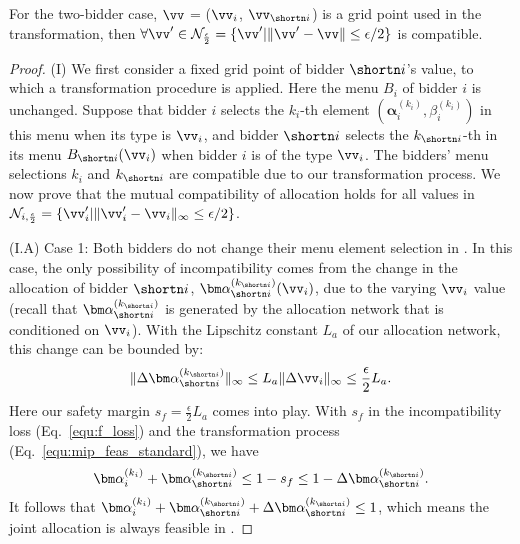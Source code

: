 \begin{theorem}\label{thm:2_bidder_comp} For the two-bidder case, $\vv$ = ($\vv_i$, $\vv_{\shortn i}$) is a grid point used in the transformation, then $\forall \vv'\in\mathcal{N}_{\frac{\epsilon}{2}}=\{\vv' | \|\vv'-\vv\|\le \epsilon / 2\}$ is compatible.
\end{theorem}
\begin{proof}
(I) We first consider a fixed grid point of bidder $\shortn i$'s value, to which a transformation procedure is applied. Here the menu $B_i$ of bidder $i$ is unchanged. Suppose that bidder $i$ selects the $k_i$-th element $(\bm\alpha_i^{(k_i)}, \beta_i^{(k_i)})$ in this menu when its type is $\vv_i$, and bidder $\shortn i$ selects the $k_{\shortn i}$-th in its menu $B_{\shortn i}(\vv_i)$ when bidder $i$ is of the type $\vv_i$. The bidders' menu selections $k_i$ and $k_{\shortn i}$ are compatible due to our transformation process. We now prove that the mutual compatibility of allocation holds for all values in $\mathcal{N}_{i,\frac{\epsilon}{2}}=\{\vv_i' | \|\vv_i'-\vv_i\|_\infty\le \epsilon / 2\}$.

(I.A) Case 1: Both bidders do not change their menu element selection in \neighbor. In this case, the only possibility of incompatibility comes from the change in the allocation of bidder $\shortn i$, $\bm\alpha_{\shortn i}^{(k_{\shortn i})}(\vv_i)$, due to the varying $\vv_i$ value (recall that $\bm\alpha_{\shortn i}^{(k_{\shortn i})}$ is generated by the allocation network that is conditioned on $\vv_i$). With the Lipschitz constant $L_a$ of our allocation network, this change can be bounded by:
\begin{align}
    \|\Delta \bm\alpha_{\shortn i}^{(k_{\shortn i})}\|_\infty \le L_a \|\Delta \vv_i\|_\infty \le \frac{\epsilon}{2}L_a.
\end{align}
Here our safety margin $s_f= \frac{\epsilon}{2}L_a $ comes into play. With $s_f$ in the incompatibility loss (Eq.~\ref{equ:f_loss}) and the transformation process (Eq.~\ref{equ:mip_feas_standard}), we have
\begin{align}
    \bm\alpha_i^{(k_i)}+\bm\alpha_{\shortn i}^{(k_{\shortn i})} \le 1 - s_f \le 1 - \Delta \bm\alpha_{\shortn i}^{(k_{\shortn i})}.
\end{align}
It follows that $\bm\alpha_i^{(k_i)}+\bm\alpha_{\shortn i}^{(k_{\shortn i})}+\Delta \bm\alpha_{\shortn i}^{(k_{\shortn i})}\le 1$, which means the joint allocation is always feasible in \neighbor.


\end{proof}
